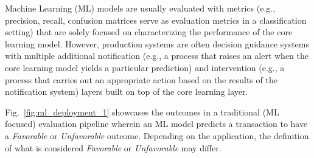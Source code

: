 \iffalse 
\begin{figure*}[!ht]
    \begin{minipage}{0.45\textwidth}
    \centering
    \texttt{[image: figures/modelops\_stage\_1.png]}
    \subcaption{Current state of ML deployment pipeline evaluation focuses only on the single stage performance of the ML model.}
    \label{fig:ml_deployment_1}
    \end{minipage}
    \hfill
    \begin{minipage}{0.45\textwidth}
    \centering
    \texttt{[image: figures/modelops\_stage\_2.png]}
    \subcaption{ML deployment pipelines are actually multi-stage decision systems with a hierarchical setup of learning, notification and intervention layers, each requiring evaluation.}
    \label{fig:ml_deployment_2}
    \end{minipage}
    \vfill
    \begin{minipage}{0.6\textwidth}
    \centering
    \texttt{[image: figures/modelops\_stage\_3.png]}
    \subcaption{A characterization (with state-specific illustrations) of the various operational states the ML deployment pipeline can assume.}
    \label{fig:ml_deployment_3}
    \end{minipage}
    \caption{Characterization of the updated ML deployment pipeline and the need for monitoring an expanded set of possible operational states.}
\end{figure*}
\fi 
Machine Learning (ML) models are usually evaluated with metrics (e.g., precision, recall, confusion matrices serve as evaluation metrics in a classification setting) that are solely focused on characterizing the performance of the core learning model. However, production systems are often decision guidance systems with multiple additional notification (e.g., a process that raises an alert when the core learning model yields a particular prediction) and intervention (e.g., a process that carries out an appropriate action based on the results of the notification system) layers built on top of the core learning layer. 

Fig.~\ref{fig:ml_deployment_1} showcases the outcomes in a traditional (ML focused) evaluation pipeline wherein an ML model predicts a transaction to have a \emph{Favorable} or \emph{Unfavorable} outcome. Depending on the application, the definition of what is considered \emph{Favorable} or \emph{Unfavorable} may differ. 

